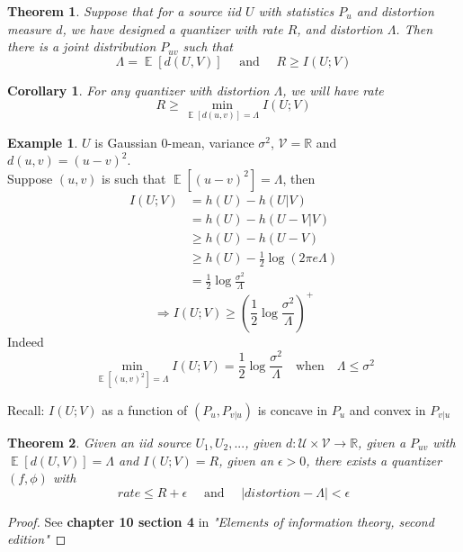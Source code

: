 \documentclass[twoside]{article}
\newtheorem{theorem}{Theorem}[section]
\newtheorem{corollary}{Corollary}[theorem]
\theoremstyle{definition} %
\newtheorem{example}{Example}
\def\V{\mathcal{V}}
\def\U{\mathcal{U}}
\def\R{\mathbb{R}}
\DeclareMathOperator{\E}{\mathbb{E}}%
\begin{document}
\begin{theorem}
  Suppose that for a source iid $U$ with statistics $P_u$ and distortion measure $d$, we have designed a quantizer with rate $R$, and distortion $\Lambda$. Then there is a joint distribution $P_{uv}$ such that
  \[
    \Lambda = \E[d(U, V)] \quad \text{ and } \quad R \geq I(U;V)
  \]
\end{theorem}

\begin{corollary}
  For any quantizer with distortion $\Lambda$, we will have rate
  \[
    R \geq \min_{\E[d(u,v)] = \Lambda} I(U;V)
  \]
\end{corollary}

\begin{example}
  $U$ is Gaussian $0$-mean, variance $\sigma^2$, $\V = \R$ and $d(u,v) = (u-v)^2$.\\
  Suppose $(u,v)$ is such that $\E[(u-v)^2] = \Lambda$, then
  \begin{align*}
    I(U;V) &= h(U) - h(U|V) \\
           &= h(U) - h(U-V|V) \\
           &\geq h(U) - h(U-V) \\
           &\geq h(U) - \frac{1}{2} \log(2 \pi e \Lambda) \\
           &= \frac{1}{2} \log \frac{\sigma^2}{\Lambda}
  \end{align*}
  \[
    \Rightarrow I(U;V) \geq (\frac{1}{2} \log \frac{\sigma^2}{\Lambda})^+
  \]
  Indeed
  \[
     \min_{\E[(u,v)^2] = \Lambda} I(U;V) = \frac{1}{2} \log \frac{\sigma^2}{\Lambda} \quad \text{when} \quad \Lambda \leq \sigma^2
  \]

  Recall: $I(U;V)$ as a function of $(P_u, P_{v|u})$ is concave in $P_u$ and convex in $P_{v|u}$
\end{example}

\begin{theorem}
  Given an iid source $U_1, U_2, ...$, given $d: \U \times \V \rightarrow \R$, given a $P_{uv}$ with $\E[d(U,V)] = \Lambda$ and $I(U;V) = R$, given an $\epsilon > 0$, there exists a quantizer $(f, \phi)$ with
  \[
    rate \leq R + \epsilon \quad \text{ and } \quad |distortion - \Lambda| < \epsilon
  \]
\end{theorem}

\begin{proof}
  See \textbf{chapter 10 section 4} in \textit{"Elements of information theory, second edition"}
\end{proof}
\end{document}

